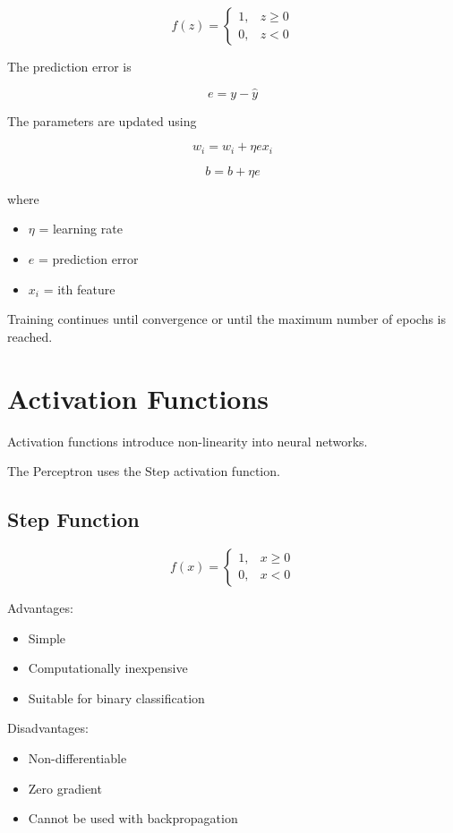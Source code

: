 \documentclass[12pt,a4paper]{article}
\begin{document}
\[
f(z)=
\begin{cases}
1,&z\ge0\\
0,&z<0
\end{cases}
\]

The prediction error is

\[
e=y-\hat y
\]

The parameters are updated using

\[
w_i=w_i+\eta ex_i
\]

\[
b=b+\eta e
\]

where

\begin{itemize}
\item $\eta$ = learning rate
\item $e$ = prediction error
\item $x_i$ = ith feature
\end{itemize}

Training continues until convergence or until the maximum number of epochs is reached.


\section{Activation Functions}

Activation functions introduce non-linearity into neural networks.

The Perceptron uses the Step activation function.

\subsection{Step Function}

\[
f(x)=
\begin{cases}
1,&x\ge0\\
0,&x<0
\end{cases}
\]

Advantages:

\begin{itemize}
\item Simple
\item Computationally inexpensive
\item Suitable for binary classification
\end{itemize}

Disadvantages:

\begin{itemize}
\item Non-differentiable
\item Zero gradient
\item Cannot be used with backpropagation
\end{itemize}
\end{document}
